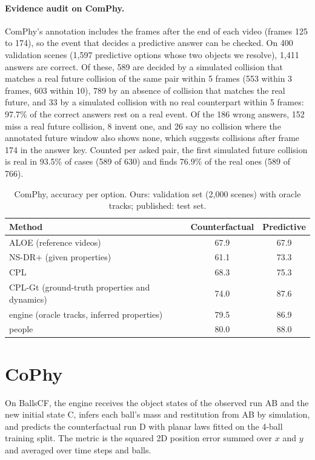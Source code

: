 \paragraph{Evidence audit on ComPhy.}
ComPhy's annotation includes the frames after the end of each video (frames 125 to 174), so the event that decides a predictive answer can be checked.
On 400 validation scenes (1,597 predictive options whose two objects we resolve), 1,411 answers are correct.
Of these, 589 are decided by a simulated collision that matches a real future collision of the same pair within 5 frames (553 within 3 frames, 603 within 10), 789 by an absence of collision that matches the real future, and 33 by a simulated collision with no real counterpart within 5 frames: 97.7\% of the correct answers rest on a real event.
Of the 186 wrong answers, 152 miss a real future collision, 8 invent one, and 26 say no collision where the annotated future window also shows none, which suggests collisions after frame 174 in the answer key.
Counted per asked pair, the first simulated future collision is real in 93.5\% of cases (589 of 630) and finds 76.9\% of the real ones (589 of 766).

\begin{table}[h]
\caption{ComPhy, accuracy per option. Ours: validation set (2,000 scenes) with oracle tracks; published: test set.}
\label{tab:comphy}
\centering
\small
\begin{tabular}{@{}lcc@{}}
\toprule
Method & Counterfactual & Predictive \\
\midrule
ALOE (reference videos) & 67.9 & 67.9 \\
NS-DR+ (given properties) & 61.1 & 73.3 \\
CPL & 68.3 & 75.3 \\
CPL-Gt (ground-truth properties and dynamics) & 74.0 & 87.6 \\
\sys{} engine (oracle tracks, inferred properties) & 79.5 & 86.9 \\
people & 80.0 & 88.0 \\
\bottomrule
\end{tabular}
\end{table}

\section{CoPhy}
\label{app:cophy}

On BallsCF, the engine receives the object states of the observed run AB and the new initial state C, infers each ball's mass and restitution from AB by simulation, and predicts the counterfactual run D with planar laws fitted on the 4-ball training split.
The metric is the squared 2D position error summed over $x$ and $y$ and averaged over time steps and balls.

